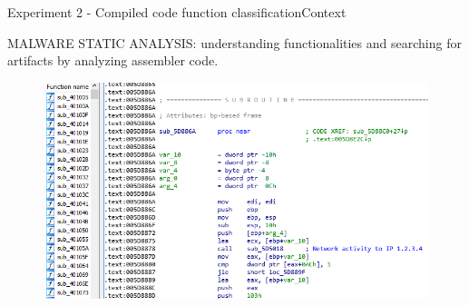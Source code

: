\documentclass[xcolor=table]{beamer}
\begin{document}
\begin{frame}{Experiment 2 - Compiled code function classification}{Context}

MALWARE STATIC ANALYSIS: understanding functionalities and searching for artifacts by analyzing assembler code.


\begin{figure}
    \includegraphics[scale=0.35]{./img/slides_exp2-context01c.png}
\end{figure}





\end{frame}
\end{document}
